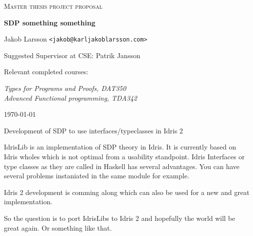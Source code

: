 \documentclass{scrartcl}
\begin{document}
\begin{titlepage}

\centering
{\scshape\LARGE Master thesis project proposal}

\vspace{0.5cm}
{\huge\bfseries SDP something something
  }

\vspace{2cm}
{\Large Jakob Larsson \texttt{<jakob@karljakoblarsson.com>}}

\vspace{1.0cm}
{\large Suggested Supervisor at CSE: Patrik Jansson }

\vspace{1.5cm}
{\large Relevant completed courses:}

{\itshape
Types for Programs and Proofs, DAT350 \\
Advanced Functional programming, TDA342 \\
}

\vfill
{\large \today}

\end{titlepage}





Development of SDP to use interfaces/typeclasses in Idris 2

IdrisLib is an implementation of SDP theory in Idris. It is currently based on
Idris wholes which is not optimal from a usability standpoint. Idris Interfaces
or type classes as they are called in Haskell has several advantages. You can
have several problems instaniated in the same module for example.

Idris 2 development is comming along which can also be used for a new and great
implementation.

So the question is to port IdrisLibs to Idris 2 and hopefully the world will be
great again. Or something like that.
\end{document}
